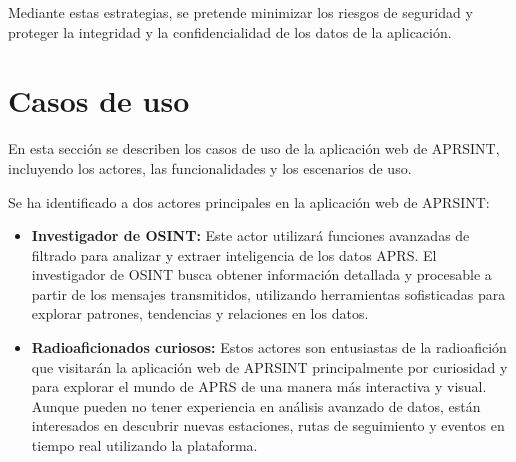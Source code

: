 \noindent Mediante estas estrategias, se pretende minimizar los riesgos de seguridad y proteger la integridad y la confidencialidad de los datos de la aplicación.

\section{Casos de uso}

En esta sección se describen los casos de uso de la aplicación web de APRSINT, incluyendo los actores, las funcionalidades y los escenarios de uso.

Se ha identificado a dos actores principales en la aplicación web de APRSINT:
\begin{itemize}
	\item \textbf{Investigador de OSINT:} Este actor utilizará funciones avanzadas de filtrado para analizar y extraer inteligencia de los datos APRS. El investigador de OSINT busca obtener información detallada y procesable a partir de los mensajes transmitidos, utilizando herramientas sofisticadas para explorar patrones, tendencias y relaciones en los datos.
	\item \textbf{Radioaficionados curiosos:} Estos actores son entusiastas de la radioafición que visitarán la aplicación web de APRSINT principalmente por curiosidad y para explorar el mundo de APRS de una manera más interactiva y visual. Aunque pueden no tener experiencia en análisis avanzado de datos, están interesados en descubrir nuevas estaciones, rutas de seguimiento y eventos en tiempo real utilizando la plataforma.
\end{itemize}


